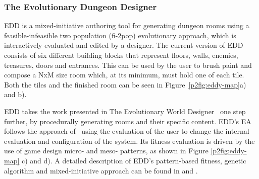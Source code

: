 

\subsubsection{The Evolutionary Dungeon Designer}

EDD is a mixed-initiative authoring tool for generating dungeon rooms using a feasible-infeasible two population (fi-2pop) evolutionary approach, which is interactively evaluated and edited by a designer. The current version of EDD consists of six different building blocks that represent floors, walls, enemies, treasures, doors and entrances. This can be used by the user to brush paint and compose a NxM size room which, at its minimum, must hold one of each tile. Both the tiles and the finished room can be seen in Figure~\ref{p2fig:eddy-map}a) and b).

EDD takes the work presented in The Evolutionary World Designer~ one step further, by procedurally generating rooms and their specific content. EDD's EA follows the approach of~ using the evaluation of the user to change the internal evaluation and configuration of the system. Its fitness evaluation is driven by the use of game design micro- and meso- patterns, as shown in Figure \ref{p2fig:eddy-map} c) and d). A detailed description of EDD's pattern-based fitness, genetic algorithm and mixed-initiative approach can be found in  and .

